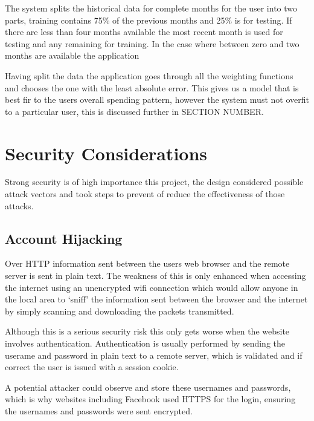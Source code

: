 
The system splits the historical data for complete months for the user into two parts, training contains 75\% of the previous months and 25\% is for testing. If there are less than four months available the most recent month is used for testing and any remaining for training. In the case where between zero and two months are available the application 

Having split the data the application goes through all the weighting functions and chooses the one with the least absolute error. This gives us a model that is best fir to the users overall spending pattern, however the system must not overfit to a particular user, this is discussed further in SECTION NUMBER.



\section{Security Considerations}
Strong security is of high importance this project, the design considered possible attack vectors and took steps to prevent of reduce the effectiveness of those attacks.

\subsection{Account Hijacking}

Over HTTP information sent between the users web browser and the remote server is sent in plain text. The weakness of this is only enhanced when accessing the internet using an unencrypted wifi connection which would allow anyone in the local area to `sniff' the information sent between the browser and the internet by simply scanning and downloading the packets transmitted.

Although this is a serious security risk this only gets worse when the website involves authentication. Authentication is usually performed by sending the userame and password in plain text to a remote server, which is validated and if correct the user is issued with a session cookie.

A potential attacker could observe and store these usernames and passwords, which is why websites including Facebook used HTTPS for the login, ensuring the usernames and passwords were sent encrypted. 

